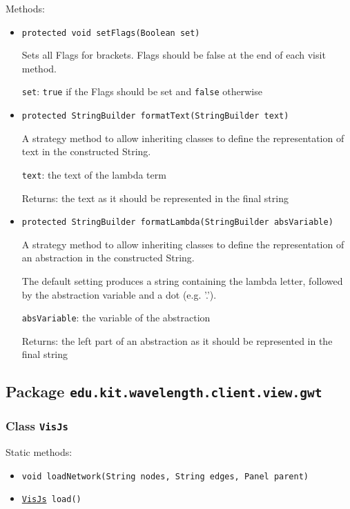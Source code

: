 Methods:
\begin{itemize}
\item \texttt{protected void setFlags(Boolean set)}

Sets all Flags for brackets. Flags should be false at the end of each
 visit method.

\texttt{set}: \texttt{true} if the Flags should be set and \texttt{false}
            otherwise

\item \texttt{protected StringBuilder formatText(StringBuilder text)}

A strategy method to allow inheriting classes to define the
 representation of text in the constructed String.

\texttt{text}: the text of the lambda term

Returns: the text as it should be represented in the final string

\item \texttt{protected StringBuilder formatLambda(StringBuilder absVariable)}

A strategy method to allow inheriting classes to define the
 representation of an abstraction in the constructed String.
 
 The default setting produces a string containing the lambda letter,
 followed by the abstraction variable and a dot (e.g. '\x.').

\texttt{absVariable}: the variable of the abstraction

Returns: the left part of an abstraction as it should be represented in
         the final string

\end{itemize}

\subsection{Package \lstinline{edu.kit.wavelength.client.view.gwt}}
\label{pkg:edu.kit.wavelength.client.view.gwt}


\subsubsection{Class \texttt{VisJs}}
\label{type:edu.kit.wavelength.client.view.gwt.VisJs}


Static methods:
\begin{itemize}
\item \texttt{void loadNetwork(String nodes, String edges, Panel parent)}



\item \texttt{\hyperref[type:edu.kit.wavelength.client.view.gwt.VisJs]{VisJs} load()}



\end{itemize}

